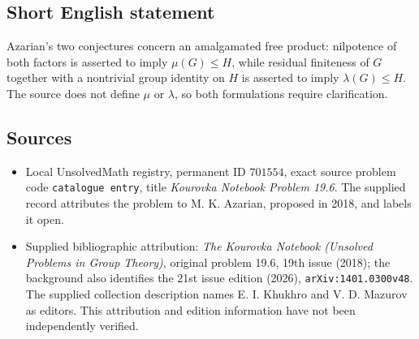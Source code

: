 \documentclass[11pt]{article}
\begin{document}
\subsection{Short English statement}
Azarian's two conjectures concern an amalgamated free product: nilpotence of both factors is asserted to imply \(\mu(G)\le H\), while residual finiteness of \(G\) together with a nontrivial group identity on \(H\) is asserted to imply \(\lambda(G)\le H\). The source does not define \(\mu\) or \(\lambda\), so both formulations require clarification.
\subsection{Sources}
\begin{itemize}
\item Local UnsolvedMath registry, permanent ID \(701554\), exact source problem code \texttt{catalogue entry}, title \emph{Kourovka Notebook Problem 19.6}. The supplied record attributes the problem to M. K. Azarian, proposed in 2018, and labels it open.
\item Supplied bibliographic attribution: \emph{The Kourovka Notebook (Unsolved Problems in Group Theory)}, original problem 19.6, 19th issue (2018); the background also identifies the 21st issue edition (2026), \texttt{arXiv:1401.0300v48}. The supplied collection description names E. I. Khukhro and V. D. Mazurov as editors. This attribution and edition information have not been independently verified.
\end{itemize}
\end{document}
